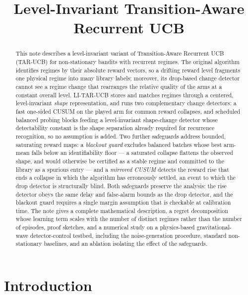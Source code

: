 \documentclass[11pt]{article}
\title{Level-Invariant Transition-Aware Recurrent UCB}
\author{}
\date{}
\begin{document}
\maketitle

\begin{abstract}
This note describes a level-invariant variant of Transition-Aware Recurrent UCB (TAR-UCB) for non-stationary bandits with recurrent regimes. The original algorithm identifies regimes by their absolute reward vectors, so a drifting reward level fragments one physical regime into many library labels; moreover, its drop-based change detector cannot see a regime change that rearranges the relative quality of the arms at a constant overall level. LI-TAR-UCB stores and matches regimes through a centered, level-invariant \emph{shape} representation, and runs two complementary change detectors: a fast one-sided CUSUM on the played arm for common reward collapses, and scheduled balanced probing blocks feeding a level-invariant shape-change detector whose detectability constant is the shape separation already required for recurrence recognition, so no assumption is added. Two further safeguards address bounded, saturating reward maps: a \emph{blackout guard} excludes balanced batches whose best arm-mean falls below an identifiability floor --- a saturated collapse flattens the observed shape, and would otherwise be certified as a stable regime and committed to the library as a spurious entry --- and a \emph{mirrored CUSUM} detects the reward rise that ends a collapse in which the algorithm has erroneously settled, an event to which the drop detector is structurally blind. Both safeguards preserve the analysis: the rise detector obeys the same delay and false-alarm bounds as the drop detector, and the blackout guard requires a single margin assumption that is checkable at calibration time. The note gives a complete mathematical description, a regret decomposition whose learning term scales with the number of distinct regimes rather than the number of episodes, proof sketches, and a numerical study on a physics-based gravitational-wave detector-control testbed, including the noise-generation procedure, standard non-stationary baselines, and an ablation isolating the effect of the safeguards.
\end{abstract}

\section{Introduction}
\label{sec:introduction}
\end{document}
